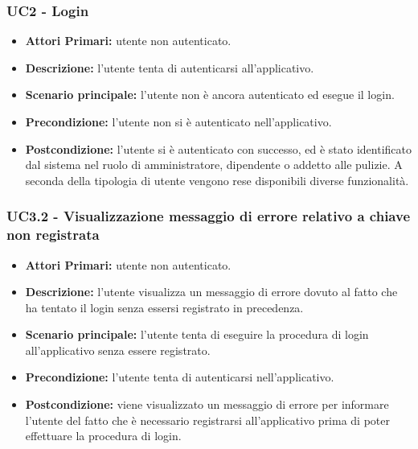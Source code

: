 \subsubsection{ UC2 - Login}
\begin{itemize}
           	\item\textbf{Attori Primari:} utente non autenticato.
           	\item\textbf{Descrizione:} l’utente tenta di autenticarsi all'applicativo.
           	\item\textbf{Scenario principale:} l’utente non è ancora autenticato ed esegue il login.
           	\item\textbf{Precondizione:} l’utente non si è autenticato nell'applicativo. 
           	\item\textbf{Postcondizione:} l’utente si è autenticato con successo, ed è stato identificato dal sistema
           	nel ruolo di amministratore, dipendente o addetto alle pulizie. A seconda della tipologia di utente vengono rese
           	disponibili diverse funzionalità.
\end{itemize}

\subsubsection{ UC3.2 - Visualizzazione messaggio di errore relativo a chiave non registrata}
\begin{itemize}
	\item\textbf{Attori Primari:} utente non autenticato.
	\item\textbf{Descrizione:} l'utente visualizza un messaggio di errore dovuto al fatto che ha tentato il login senza essersi registrato in precedenza.
	\item\textbf{Scenario principale:} l’utente tenta di eseguire la procedura di login all'applicativo senza essere registrato.
	\item\textbf{Precondizione:} l'utente tenta di autenticarsi nell'applicativo.
	\item\textbf{Postcondizione:} viene visualizzato un messaggio di errore per informare l'utente del fatto che è necessario registrarsi
	all'applicativo prima di poter effettuare la procedura di login.
\end{itemize}
